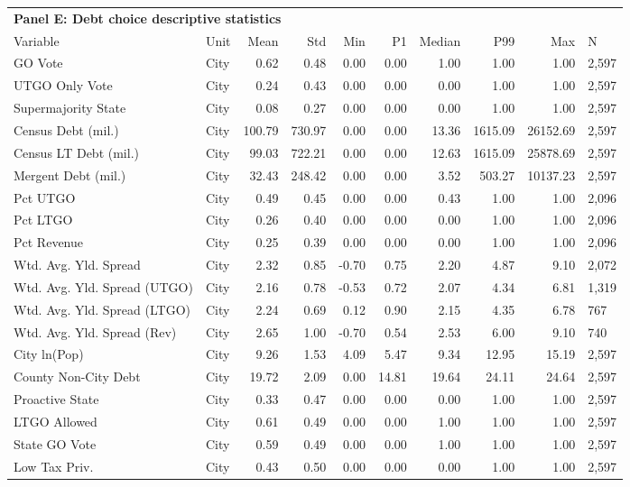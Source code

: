 \begin{table}[H]
\centering
\begin{tabular*}{\textwidth}{@{\extracolsep{\fill}}llrrrrrrrl}
\multicolumn{10}{l}{\textbf{Panel E: Debt choice descriptive statistics}}\\

\addlinespace
  \toprule
Variable & Unit & Mean & Std & Min & P1 & Median & P99 & Max & N \\ 
  \hline
GO Vote & City & 0.62 & 0.48 & 0.00 & 0.00 & 1.00 & 1.00 & 1.00 & 2,597 \\ 
  UTGO Only Vote & City & 0.24 & 0.43 & 0.00 & 0.00 & 0.00 & 1.00 & 1.00 & 2,597 \\ 
  Supermajority State & City & 0.08 & 0.27 & 0.00 & 0.00 & 0.00 & 1.00 & 1.00 & 2,597 \\ 
  Census Debt (mil.) & City & 100.79 & 730.97 & 0.00 & 0.00 & 13.36 & 1615.09 & 26152.69 & 2,597 \\ 
  Census LT Debt (mil.) & City & 99.03 & 722.21 & 0.00 & 0.00 & 12.63 & 1615.09 & 25878.69 & 2,597 \\ 
  Mergent Debt (mil.) & City & 32.43 & 248.42 & 0.00 & 0.00 & 3.52 & 503.27 & 10137.23 & 2,597 \\ 
  Pct UTGO & City & 0.49 & 0.45 & 0.00 & 0.00 & 0.43 & 1.00 & 1.00 & 2,096 \\ 
  Pct LTGO & City & 0.26 & 0.40 & 0.00 & 0.00 & 0.00 & 1.00 & 1.00 & 2,096 \\ 
  Pct Revenue & City & 0.25 & 0.39 & 0.00 & 0.00 & 0.00 & 1.00 & 1.00 & 2,096 \\ 
  Wtd. Avg. Yld. Spread & City & 2.32 & 0.85 & -0.70 & 0.75 & 2.20 & 4.87 & 9.10 & 2,072 \\ 
  Wtd. Avg. Yld. Spread (UTGO) & City & 2.16 & 0.78 & -0.53 & 0.72 & 2.07 & 4.34 & 6.81 & 1,319 \\ 
  Wtd. Avg. Yld. Spread (LTGO) & City & 2.24 & 0.69 & 0.12 & 0.90 & 2.15 & 4.35 & 6.78 &   767 \\ 
  Wtd. Avg. Yld. Spread (Rev) & City & 2.65 & 1.00 & -0.70 & 0.54 & 2.53 & 6.00 & 9.10 &   740 \\ 
  City ln(Pop) & City & 9.26 & 1.53 & 4.09 & 5.47 & 9.34 & 12.95 & 15.19 & 2,597 \\ 
  County Non-City Debt & City & 19.72 & 2.09 & 0.00 & 14.81 & 19.64 & 24.11 & 24.64 & 2,597 \\ 
  Proactive State & City & 0.33 & 0.47 & 0.00 & 0.00 & 0.00 & 1.00 & 1.00 & 2,597 \\ 
  LTGO Allowed & City & 0.61 & 0.49 & 0.00 & 0.00 & 1.00 & 1.00 & 1.00 & 2,597 \\ 
  State GO Vote & City & 0.59 & 0.49 & 0.00 & 0.00 & 1.00 & 1.00 & 1.00 & 2,597 \\ 
  Low Tax Priv. & City & 0.43 & 0.50 & 0.00 & 0.00 & 0.00 & 1.00 & 1.00 & 2,597 \\ 
   \hline
\end{tabular*}
\end{table}
